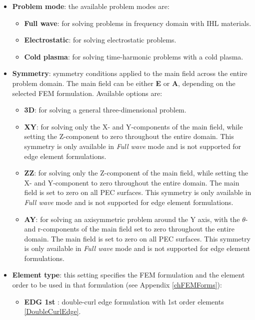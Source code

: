 \begin{itemize}\itemsep0em 
	\item \textbf{Problem mode}: the available problem modes are:
	\begin{itemize}\itemsep0.25em 
		\item \textbf{Full wave}: for solving problems in frequency domain with IHL materials.
		\item \textbf{Electrostatic}: for solving electrostatic problems.
		\item \textbf{Cold plasma}: for solving time-harmonic problems with a cold plasma.
    \end{itemize}
    \quad
	\item \textbf{Symmetry}: symmetry conditions applied to the main field across the entire problem domain. The main field can be either \textbf{E} or \textbf{A}, depending on the selected FEM formulation. Available options are: 
	\begin{itemize}\itemsep0.5em 
		\item \textbf{3D}: for solving a general three-dimensional problem.
		\item \textbf{XY}: for solving only the X- and Y-components of the main field, while setting the Z-component to zero throughout the entire domain. This symmetry is only available in \textit{Full wave} mode and is not supported for edge element formulations.
		\item \textbf{ZZ}: for solving only the Z-component of the main field, while setting the X- and Y-component to zero throughout the entire domain. The main field is set to zero on all PEC surfaces. This symmetry is only available in \textit{Full wave} mode and is not supported for edge element formulations.
		\item \textbf{AY}: for solving an axisymmetric problem around the Y axis, with the $\theta$- and r-components of the main field set to zero throughout the entire domain. The main field is set to zero on all PEC surfaces. This symmetry is only available in \textit{Full wave} mode and is not supported for edge element formulations.
	\end{itemize}
    \quad
	\item \textbf{Element type}: this setting specifies the FEM formulation and the element order to be used in that formulation (see Appendix \ref{chFEMForms}):
	\begin{itemize}\itemsep0.25em 
		\item \textbf{EDG 1st}\,\,: double-curl edge formulation with 1st order elements \ref{DoubleCurlEdge}.

\end{itemize}
\end{itemize}
